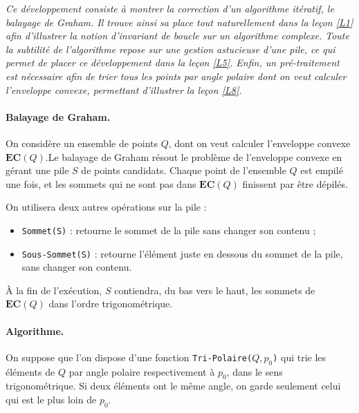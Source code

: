 
\textit{
Ce développement consiste à montrer la correction d'un algorithme itératif, le balayage de Graham. Il trouve ainsi sa place tout naturellement dans la leçon \ref{L1} afin d'illustrer la notion d'invariant de boucle sur un algorithme complexe. Toute la subtilité de l'algorithme repose sur une gestion astucieuse d'une pile, ce qui permet de placer ce développement dans la leçon \ref{L5}. Enfin, un pré-traitement est nécessaire afin de trier tous les points par angle polaire dont on veut calculer l'enveloppe convexe, permettant d'illustrer la leçon \ref{L8}.
}
\paragraph{Balayage de Graham.} On considère un ensemble de points $Q$, dont on veut calculer l’enveloppe convexe $\mathbf{EC}(Q)$.Le balayage de Graham résout le problème de l'enveloppe convexe en gérant une pile $S$ de points candidats. Chaque point de l'ensemble $Q$ est empilé une fois, et les sommets qui ne sont pas dans $\mathbf{EC}(Q)$ finissent par être dépilés.

On utilisera deux autres opérations sur la pile :
\begin{itemize}
\item {\tt Sommet(S)} : retourne le sommet de la pile sans changer son contenu ;
\item {\tt Sous-Sommet(S)} : retourne l'élément juste en dessous du sommet de la pile, sans changer son contenu.
\end{itemize}  

À la fin de l'exécution, $S$ contiendra, du bas vers le haut, les sommets de $\mathbf{EC}(Q)$ dans l'ordre trigonométrique.

\paragraph{Algorithme.} On suppose que l'on dispose d'une fonction {\tt Tri-Polaire($Q,p_0$)} qui trie les éléments de $Q$ par angle polaire respectivement à $p_0$, dans le sens trigonométrique. Si deux éléments ont le même angle, on garde seulement celui qui est le plus loin de $p_0$.\newline

